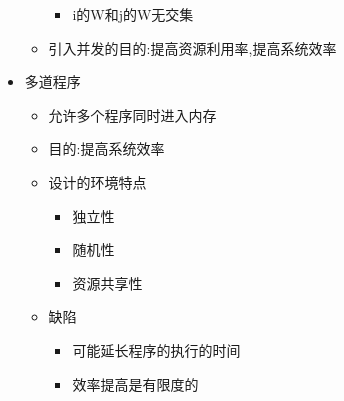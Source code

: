\documentclass[a4paper,12pt,notitlepage]{article}
\begin{document}
\begin{itemize}
\begin{itemize}
\begin{itemize}
			\item i的W和j的W无交集
		\end{itemize}
		\item 引入并发的目的:提高资源利用率,提高系统效率
	\end{itemize}
	\item 多道程序
	\begin{itemize}
		\item 允许多个程序同时进入内存
		\item 目的:提高系统效率
		\item 设计的环境特点
		\begin{itemize}
			\item 独立性
			\item 随机性
			\item 资源共享性
		\end{itemize}
		\item 缺陷
		\begin{itemize}
			\item 可能延长程序的执行的时间
			\item 效率提高是有限度的
		\end{itemize}
	\end{itemize}
\end{itemize}
\end{document}
